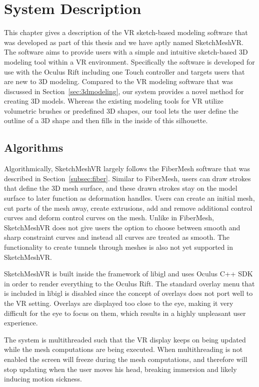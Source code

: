 \chapter{System Description}
\label{chap:system}
This chapter gives a description of the VR sketch-based modeling software that was developed as part of this thesis and we have aptly named SketchMeshVR. The software aims to provide users with a simple and intuitive sketch-based 3D modeling tool within a VR environment. Specifically the software is developed for use with the Oculus Rift including one Touch controller and targets users that are new to 3D modeling. Compared to the VR modeling software that was discussed in Section~\ref{sec:3dmodeling}, our system provides a novel method for creating 3D models. Whereas the existing modeling tools for VR utilize volumetric brushes or predefined 3D shapes, our tool lets the user define the outline of a 3D shape and then fills in the inside of this silhouette. 

\section{Algorithms}
Algorithmically, SketchMeshVR largely follows the FiberMesh software that was described in Section~\ref{subsec:fiber}. Similar to FiberMesh, users can draw strokes that define the 3D mesh surface, and these drawn strokes stay on the model surface to later function as deformation handles. Users can create an initial mesh, cut parts of the mesh away, create extrusions, add and remove additional control curves and deform control curves on the mesh. Unlike in FiberMesh, SketchMeshVR does not give users the option to choose between smooth and sharp constraint curves and instead all curves are treated as smooth. The functionality to create tunnels through meshes is also not yet supported in SketchMeshVR.  

SketchMeshVR is built inside the framework of libigl \cite{Jacobson2017} and uses Oculus C++ SDK in order to render everything to the Oculus Rift. The standard overlay menu that is included in libigl is disabled since the concept of overlays does not port well to the VR setting. Overlays are displayed too close to the eye, making it very difficult for the eye to focus on them, which results in a highly unpleasant user experience. 

The system is multithreaded such that the VR display keeps on being updated while the mesh computations are being executed. When multithreading is not enabled the screen will freeze during the mesh computations, and therefore will stop updating when the user moves his head, breaking immersion and likely inducing motion sickness. 

